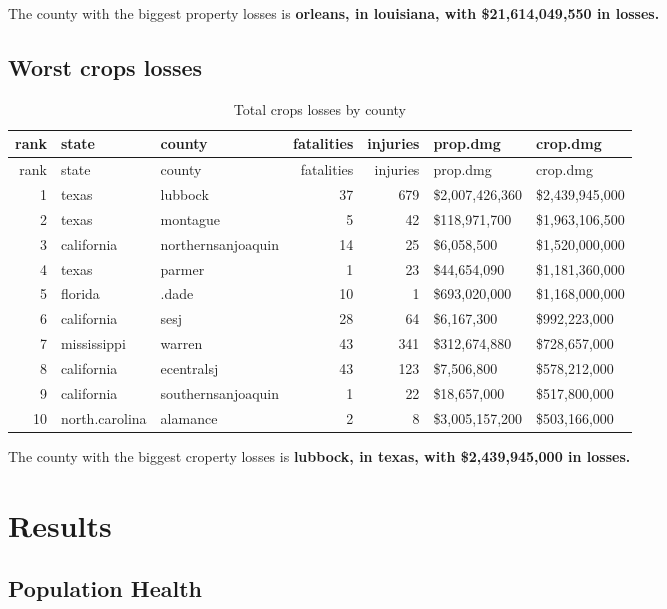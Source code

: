 \documentclass[]{article}
\begin{document}
The county with the biggest property losses is \textbf{orleans, in
louisiana, with \$21,614,049,550 in losses.}

\subsection{Worst crops losses}\label{worst-crops-losses}

\begin{longtable}[]{@{}rllrrll@{}}
\caption{Total crops losses by county}\tabularnewline
\toprule
rank & state & county & fatalities & injuries & prop.dmg &
crop.dmg\tabularnewline
\midrule
\endfirsthead
\toprule
rank & state & county & fatalities & injuries & prop.dmg &
crop.dmg\tabularnewline
\midrule
\endhead
1 & texas & lubbock & 37 & 679 & \$2,007,426,360 &
\$2,439,945,000\tabularnewline
2 & texas & montague & 5 & 42 & \$118,971,700 &
\$1,963,106,500\tabularnewline
3 & california & northernsanjoaquin & 14 & 25 & \$6,058,500 &
\$1,520,000,000\tabularnewline
4 & texas & parmer & 1 & 23 & \$44,654,090 &
\$1,181,360,000\tabularnewline
5 & florida & .dade & 10 & 1 & \$693,020,000 &
\$1,168,000,000\tabularnewline
6 & california & sesj & 28 & 64 & \$6,167,300 &
\$992,223,000\tabularnewline
7 & mississippi & warren & 43 & 341 & \$312,674,880 &
\$728,657,000\tabularnewline
8 & california & ecentralsj & 43 & 123 & \$7,506,800 &
\$578,212,000\tabularnewline
9 & california & southernsanjoaquin & 1 & 22 & \$18,657,000 &
\$517,800,000\tabularnewline
10 & north.carolina & alamance & 2 & 8 & \$3,005,157,200 &
\$503,166,000\tabularnewline
\bottomrule
\end{longtable}

The county with the biggest croperty losses is \textbf{lubbock, in
texas, with \$2,439,945,000 in losses.}

\section{Results}\label{results}

\subsection{Population Health}\label{population-health}
\end{document}
